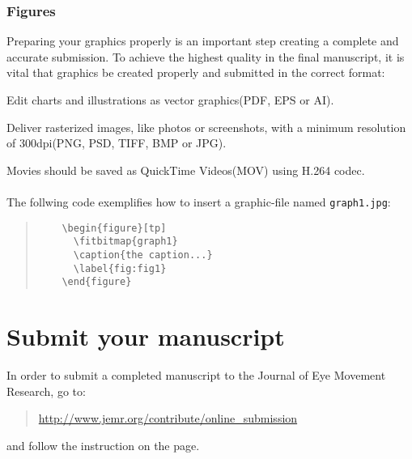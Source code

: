 \documentclass[jou,a4paper,notxfonts]{apa}
\begin{document}
\subsubsection{Figures}
Preparing your graphics properly is an important
step creating a complete and accurate submission.
To achieve the highest quality in the final manuscript, it is
vital that graphics be created properly and submitted in
the correct format: 
\newline

       \begin{APAitemize}
       
        \item Edit charts and illustrations as vector graphics(PDF, EPS or AI).
        \item Deliver rasterized images, like photos or screenshots, with a minimum resolution of 300dpi(PNG, PSD, TIFF, BMP or JPG).
        \item Movies should be saved as QuickTime Videos(MOV) using H.264 codec.
        
       \end{APAitemize}
\paragraph{}
The follwing code exemplifies how to insert a graphic-file named {\tt{graph1.jpg}}:
\begin{quote}
\begin{verbatim}
	\begin{figure}[tp]
	  \fitbitmap{graph1}
	  \caption{the caption...} 
	  \label{fig:fig1}
	\end{figure}
\end{verbatim}
\end{quote}
\paragraph{}
\section{Submit your manuscript}
In order to submit a completed manuscript to the
Journal of Eye Movement Research, go to:
\begin{quote}
\url{http://www.jemr.org/contribute/online_submission}
\end{quote}
and follow the instruction on the page.



\end{document}
